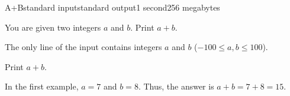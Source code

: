 \begin{problem}{A+B}{standard input}{standard output}{1 second}{256 megabytes}

You are given two integers $a$ and $b$. Print $a+b$.

\InputFile
The only line of the input contains integers $a$ and $b$ ($-100 \le a,b \le 100$).

\OutputFile
Print $a+b$.

\Examples

\begin{example}
%
%
%
\end{example}

\Note
In the first example, $a=7$ and $b=8$. Thus, the answer is $a+b=7+8=15$.

\end{problem}

